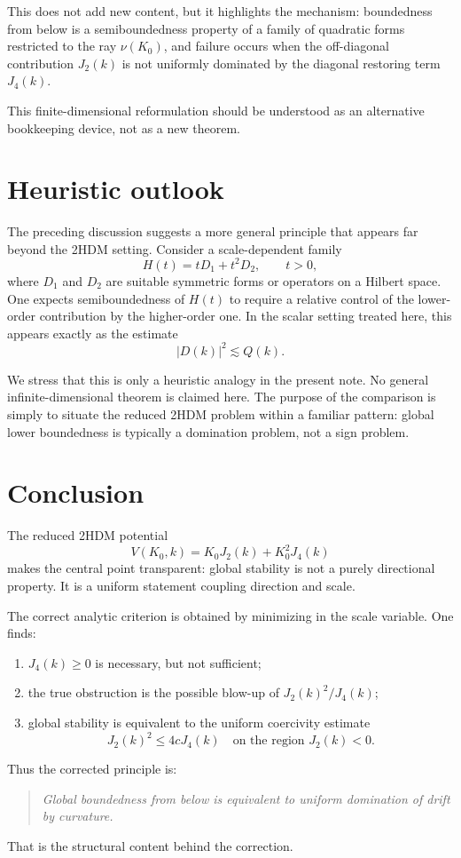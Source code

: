 \documentclass[11pt,a4paper]{article}
\theoremstyle{plain}
\theoremstyle{definition}
\theoremstyle{remark}
\begin{document}
This does not add new content, but it highlights the mechanism: boundedness from below is a semiboundedness property of a family of quadratic forms restricted to the ray $\nu(K_0)$, and failure occurs when the off-diagonal contribution $J_2(k)$ is not uniformly dominated by the diagonal restoring term $J_4(k)$.

This finite-dimensional reformulation should be understood as an alternative bookkeeping device, not as a new theorem.

\section{Heuristic outlook}

The preceding discussion suggests a more general principle that appears far beyond the 2HDM setting. Consider a scale-dependent family
\[
H(t)=tD_1+t^2D_2,
\qquad t>0,
\]
where $D_1$ and $D_2$ are suitable symmetric forms or operators on a Hilbert space. One expects semiboundedness of $H(t)$ to require a relative control of the lower-order contribution by the higher-order one. In the scalar setting treated here, this appears exactly as the estimate
\[
|D(k)|^2\lesssim Q(k).
\]

We stress that this is only a heuristic analogy in the present note. No general infinite-dimensional theorem is claimed here. The purpose of the comparison is simply to situate the reduced 2HDM problem within a familiar pattern: global lower boundedness is typically a domination problem, not a sign problem.

\section{Conclusion}

The reduced 2HDM potential
\[
V(K_0,k)=K_0J_2(k)+K_0^2J_4(k)
\]
makes the central point transparent: global stability is not a purely directional property. It is a uniform statement coupling direction and scale.

The correct analytic criterion is obtained by minimizing in the scale variable. One finds:
\begin{enumerate}[label=\arabic*.,leftmargin=2em]
\item $J_4(k)\ge 0$ is necessary, but not sufficient;
\item the true obstruction is the possible blow-up of $J_2(k)^2/J_4(k)$;
\item global stability is equivalent to the uniform coercivity estimate
\[
J_2(k)^2\le 4cJ_4(k)
\quad\text{on the region }J_2(k)<0.
\]
\end{enumerate}
Thus the corrected principle is:
\begin{quote}
\emph{Global boundedness from below is equivalent to uniform domination of drift by curvature.}
\end{quote}
That is the structural content behind the correction.
\end{document}
